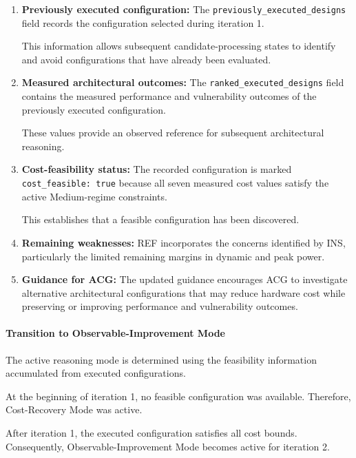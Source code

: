 \begin{enumerate}

\item \textbf{Previously executed configuration:}
The \texttt{previously\_executed\_designs}
field records the configuration selected
during iteration 1.

This information allows subsequent
candidate-processing states to identify
and avoid configurations that have
already been evaluated.

\item \textbf{Measured architectural outcomes:}
The \texttt{ranked\_executed\_designs}
field contains the measured performance
and vulnerability outcomes of the
previously executed configuration.

These values provide an observed reference
for subsequent architectural reasoning.

\item \textbf{Cost-feasibility status:}
The recorded configuration is marked
\texttt{cost\_feasible: true} because
all seven measured cost values satisfy
the active Medium-regime constraints.

This establishes that a feasible
configuration has been discovered.

\item \textbf{Remaining weaknesses:}
REF incorporates the concerns identified
by INS, particularly the limited remaining
margins in dynamic and peak power.

\item \textbf{Guidance for ACG:}
The updated guidance encourages ACG
to investigate alternative architectural
configurations that may reduce hardware
cost while preserving or improving
performance and vulnerability outcomes.

\end{enumerate}

\paragraph{Transition to Observable-Improvement Mode}

The active reasoning mode is determined
using the feasibility information
accumulated from executed configurations.

At the beginning of iteration 1, no
feasible configuration was available.
Therefore, Cost-Recovery Mode was active.

After iteration 1, the executed
configuration satisfies all cost bounds.
Consequently, Observable-Improvement Mode
becomes active for iteration 2.

